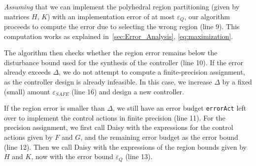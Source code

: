 \emph{Assuming} that we can implement the polyhedral region partitioning (given by
matrices $H$, $K$) with an implementation error of at most $\varepsilon_Q$,
our algorithm proceeds to compute the error due to selecting the wrong region (line 9).
This computation works as explained in~\autoref{sec:Error_Analysis}, \autoref{eq:maximization}.



The algorithm then checks whether the region error remains below the disturbance
bound used for the synthesis of the controller (line 10). 
If the error already exceeds $\Delta$, we do not attempt to compute a finite-precision
assignment, as the controller design is already infeasible.
In this case, we increase $\Delta$ by a fixed (small) amount $\varepsilon_{SAFE}$ (line 16) and 
design a new controller. 


If the region error is smaller than $\Delta$, we still have an error budget \texttt{errorAct} left
over to implement the control actions in finite precision (line 11).
For the precision assignment, we first call Daisy with the expressions for the
control actions given by $F$ and $G$, and the remaining error
budget as the error bound (line 12).
Then we call Daisy with the expressions of the region bounds given by $H$
and $K$, now with the error bound $\varepsilon_Q$ (line 13).

